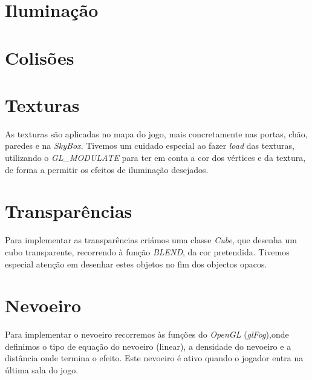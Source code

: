 \documentclass[12pt]{article}
\begin{document}
\section{Iluminação}

\section{Colisões}

\section{Texturas}
As texturas são aplicadas no mapa do jogo, mais concretamente nas portas, chão, paredes e na \emph{SkyBox}. Tivemos um cuidado especial ao fazer \emph{load} das texturas, utilizando o \emph{GL\_MODULATE} para ter em conta a cor dos vértices e da textura, de forma a permitir os efeitos de iluminação desejados.

\section{Transparências}
Para implementar as transparências criámos uma classe \emph{Cube}, que desenha um cubo transparente, recorrendo à função \emph{BLEND}, da cor pretendida. Tivemos especial atenção em desenhar estes objetos no fim dos objectos opacos.   

\section{Nevoeiro}
Para implementar o nevoeiro recorremos às funções do \emph{OpenGL} (\emph{glFog}),onde definimos o tipo de equação do nevoeiro (linear), a densidade do nevoeiro e a distância onde termina o efeito. Este nevoeiro é ativo quando o jogador entra na última sala do jogo.
\end{document}
